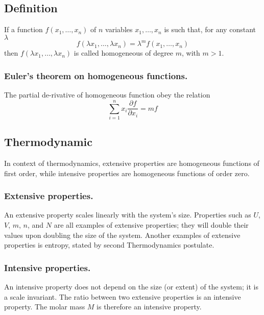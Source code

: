 \documentclass[../../../Main.tex]{subfiles}
\begin{document}
\subsection{Definition}
If a function $f(x_1,\dots, x_n)$ of $n$ variables $x_1,\dots, x_n$ is such that, for any constant $\lambda$
\begin{equation*}
    f(\lambda x_1,\dots,\lambda x_n )=\lambda^mf( x_1,\dots, x_n )
\end{equation*}
then $f(\lambda x_1,\dots,\lambda x_n )$ is called homogeneous of degree $m$, with $m>1$.

\subsubsection{Euler’s theorem on homogeneous functions.} The partial de-rivative of homogeneous function obey the relation 
\begin{equation*}
    \sum_{i=1}^{n }x_i\frac{\partial f}{\partial x_i}=mf
\end{equation*} 

\subsection{Thermodynamic}
In context of thermodynamics, extensive properties are homogeneous functions of first order, while intensive properties are homogeneous functions of order zero. 
\subsubsection{Extensive properties.} An extensive property scales linearly with the system’s size. Properties such as $U$, $V$, $m$, $n$, and $N$ are all examples of extensive properties; they will double their values upon doubling the size of the system.  Another examples of extensive properties is entropy, stated by second Thermodynamics postulate.

\subsubsection{Intensive properties.} An intensive property does not depend on the size (or extent) of the system; it is a scale invariant. The ratio between two extensive properties is an intensive property. The molar mass $M$ is therefore an intensive property.
\end{document}
